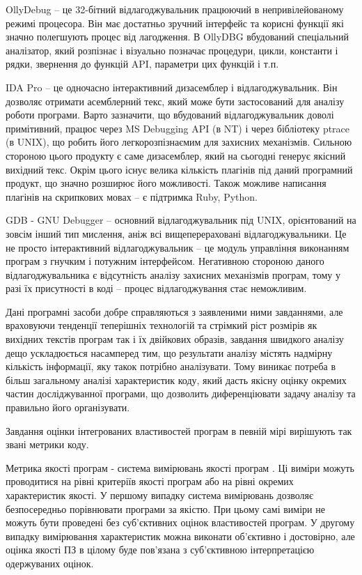 OllyDebug – це 32-бітний відлагоджувальник працюючий в непривілейованому режимі процесора. Він має достатньо зручний інтерфейс та корисні функції які значно полегшують процес від лагодження.  В OllyDBG вбудований спеціальний аналізатор, який розпізнає і візуально позначає процедури, цикли, константи і рядки, звернення до функцій API, параметри цих функцій і т.п.

IDA Pro – це одночасно інтерактивний дизасемблер і відлагоджувальник. Він дозволяє отримати асемблерний текс, який може бути застосований для аналізу роботи програми. Варто зазначити, що вбудований відлагоджувальник доволі примітивний, працює через MS Debugging API (в NT) і через бібліотеку ptrace (в UNIX), що робить його легкорозпізнаємим для захисних механізмів. Сильною стороною цього продукту є саме дизасемблер, який на сьогодні генерує якісний вихідний текс. Окрім цього існує велика кількість плагінів під даний програмний продукт, що значно розширює його можливості. Також можливе написання плагінів на скрипкових мовах – є підтримка Ruby, Python.

GDB - GNU Debugger – основний відлагоджувальник під UNIX, орієнтований на зовсім інший тип мислення, аніж всі вищеперераховані відлагоджувальники. Це не просто інтерактивний відлагоджувальник – це модуль управління виконанням програм з гнучким і потужним інтерфейсом. Негативною стороною даного відлагоджувальника є відсутність аналізу захисних механізмів програм, тому у разі їх присутності в коді – процес відлагоджування стає неможливим.

Дані програмні засоби добре справляються з заявленими ними завданнями, але враховуючи тенденції теперішніх технологій та стрімкий ріст розмірів як вихідних текстів програм так і їх двійкових образів, завдання швидкого аналізу дещо ускладюється насамперед тим, що результати аналізу містять надмірну кількість інформації, яку такок потрібно аналізувати. Тому виникає потреба в більш загальному аналізі характеристик коду, який дасть якісну оцінку окремих частин досліджуванної програми, що дозволить диференціювати задачу аналізу та правильно його організувати.

Завдання оцінки інтегрованих властивостей програм в певній мірі вирішують так звані метрики коду. 

Метрика якості програм - система вимірювань якості програм . Ці виміри можуть проводитися на рівні критеріїв якості програм або на рівні окремих характеристик якості. У першому випадку система вимірювань дозволяє безпосередньо порівнювати програми за якістю. При цьому самі виміри не можуть бути проведені без суб'єктивних оцінок властивостей програм. У другому випадку вимірювання характеристик можна виконати об'єктивно і достовірно, але оцінка якості ПЗ в цілому буде пов'язана з суб'єктивною інтерпретацією одержуваних оцінок.

